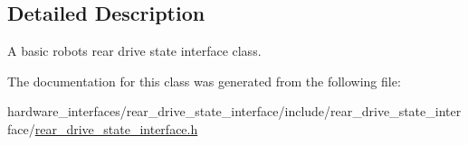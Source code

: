 \subsection{Detailed Description}
A basic robot\textquotesingle{}s rear drive state interface class. 

The documentation for this class was generated from the following file\+:\begin{DoxyCompactItemize}
\item 
hardware\+\_\+interfaces/rear\+\_\+drive\+\_\+state\+\_\+interface/include/rear\+\_\+drive\+\_\+state\+\_\+interface/\hyperlink{rear__drive__state__interface_8h}{rear\+\_\+drive\+\_\+state\+\_\+interface.\+h}\end{DoxyCompactItemize}
